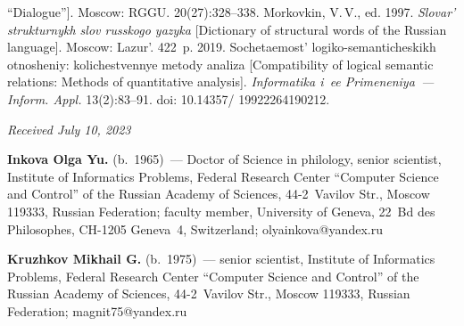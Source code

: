 \begin{multicols}{2}
{{\begin{thebibliography}{99}
``Dialogue'']. Moscow: RGGU. 20(27):328--338.
Morkovkin, V.\,V., ed. 1997. \textit{Slo\-var' struk\-tur\-nykh slov rus\-sko\-go 
yazyka} [Dictionary of structural words of the Russian language]. Moscow: Lazur'. 422~p. 
 2019. So\-che\-ta\-e\-most'  
logiko-semanticheskikh ot\-no\-she\-niy: ko\-li\-chest\-ven\-nye me\-to\-dy ana\-li\-za 
[Compatibility of logical semantic relations: Methods of quantitative analysis]. \textit{In\-for\-ma\-ti\-ka i~ee  
Pri\-me\-ne\-niya~--- Inform. Appl.} 
 13(2):83--91. doi: 10.14357/ 19922264190212.
 
 \end{thebibliography}

 }
 }

\end{multicols}

\vspace*{-6pt}

\hfill{\small\textit{Received July 10, 2023}} 

\vspace*{-18pt}

\Contr

\vspace*{-4pt}

\noindent
\textbf{Inkova Olga Yu.} (b.\ 1965)~--- Doctor of Science in philology, senior 
scientist, Institute of 
Informatics Problems, Federal Research Center ``Computer Science and Control'' of 
the Russian Academy of 
Sciences, 44-2~Vavilov Str., Moscow 119333, Russian Federation; faculty member, 
University of Geneva, 22~Bd des Philosophes, CH-1205 Geneva~4, Switzerland; 
\mbox{olyainkova@yandex.ru}

\vspace*{3pt}

\noindent
\textbf{Kruzhkov Mikhail G.} (b.\ 1975)~--- senior scientist, Institute of Informatics 
Problems, Federal Research Center ``Computer Science and Control'' of the Russian Academy of 
Sciences, 44-2~Vavilov Str., 
Moscow 119333, Russian Federation; \mbox{magnit75@yandex.ru}





\label{end\stat}

\renewcommand{\bibname}{\protect\rm Литература} 